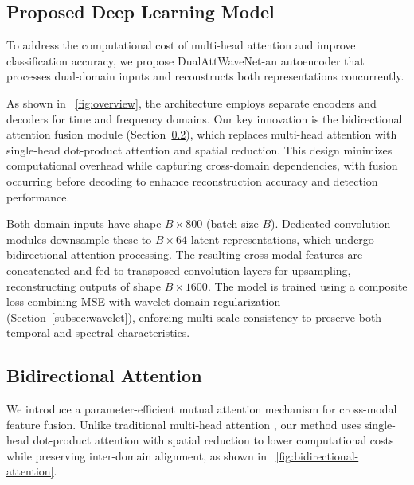 \documentclass[conference]{IEEEtran}
\begin{document}

\subsection{Proposed Deep Learning Model}
\label{subsec:proposed_model}

To address the computational cost of multi-head attention and improve classification accuracy, we propose DualAttWaveNet-an autoencoder that processes dual-domain inputs and reconstructs both representations concurrently.

As shown in \figurename~\ref{fig:overview}, the architecture employs separate encoders and decoders for time and frequency domains. Our key innovation is the bidirectional attention fusion module (Section~\ref{subsec:bi_attn}), which replaces multi-head attention with single-head dot-product attention and spatial reduction. This design minimizes computational overhead while capturing cross-domain dependencies, with fusion occurring before decoding to enhance reconstruction accuracy and detection performance.

Both domain inputs have shape $B \times 800$ (batch size $B$). Dedicated convolution modules downsample these to $B \times 64$ latent representations, which undergo bidirectional attention processing. The resulting cross-modal features are concatenated and fed to transposed convolution layers for upsampling, reconstructing outputs of shape $B \times 1600$. The model is trained using a composite loss combining MSE with wavelet-domain regularization (Section~\ref{subsec:wavelet}), enforcing multi-scale consistency to preserve both temporal and spectral characteristics.

\subsection{Bidirectional Attention}
\label{subsec:bi_attn}

We introduce a parameter-efficient mutual attention mechanism for cross-modal feature fusion. Unlike traditional multi-head attention \cite{vaswaniAttentionAllYou2017}, our method uses single-head dot-product attention with spatial reduction to lower computational costs while preserving inter-domain alignment, as shown in \figurename~\ref{fig:bidirectional-attention}.
\end{document}
